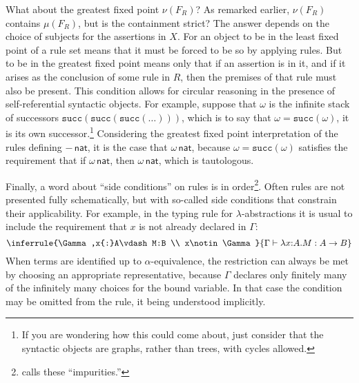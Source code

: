 \documentclass[11pt,twoside]{article}
\newcommand{\IsNat}[1]{{#1}\,\mathsf{nat}}
\newcommand{\succnat}[1]{\mathtt{succ}(#1)}
\begin{document}
\smallskip

What about the greatest fixed point $\nu(F_{R})$?  As remarked earlier, $\nu(F_{R})$ contains
$\mu(F_{R})$, but is the containment strict?  The answer depends on the choice of subjects
for the assertions in $X$.  For an object to be in the least fixed point of a rule set
means that it must be forced to be so by applying rules.  But to be in the greatest fixed
point means only that if an assertion is in it, and if it arises as the conclusion of some
rule in $R$, then the premises of that rule must also be present.  This condition allows
for circular reasoning in the presence of self-referential syntactic objects.  For
example, suppose that $\omega$ is the infinite stack of successors
$\succnat{\succnat{\succnat{\dots}}}$, which is to say that $\omega=\succnat{\omega}$, it is its own
successor.\footnote{If you are wondering how this could come about, just consider that the
  syntactic objects are graphs, rather than trees, with cycles allowed.}  Considering the
greatest fixed point interpretation of the rules defining $\IsNat{-}$, it is the case that
$\IsNat{\omega}$, because $\omega=\succnat{\omega}$ satisfies the requirement that if
$\IsNat{\omega}$, then $\IsNat{\omega}$, which is tautologous.

\smallskip

Finally, a word about ``side conditions'' on rules is in order\footnote{\citet{avron91:scr} calls these
  ``impurities.''}.  Often rules are not presented fully schematically, but with so-called
side conditions that constrain their applicability.  For example, in the typing rule for
$\lambda$-abstractions it is usual to include the requirement that $x$ is not already declared
in $\Gamma$:
\begin{displaymath}
  \inferrule
  {\Gamma,x{:}A\vdash M:B \\ x\notin\Gamma}
  {\Gamma\vdash\lambda x{:}A.M:A\to B}
\end{displaymath}
When terms are identified up to $\alpha$-equivalence, the restriction can always be met by
choosing an appropriate representative, because $\Gamma$ declares only finitely many of the
infinitely many choices for the bound variable.  In that case the condition may be omitted
from the rule, it being understood implicitly.
\end{document}
